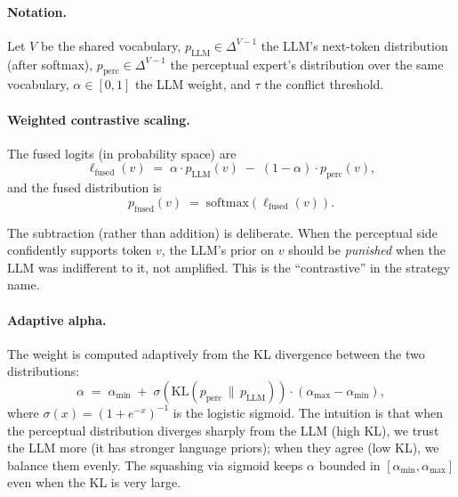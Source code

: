\documentclass[11pt,a4paper]{article}
\newcommand{\pLLM}{p_{\mathrm{LLM}}}
\newcommand{\pperc}{p_{\mathrm{perc}}}
\newcommand{\pfused}{p_{\mathrm{fused}}}
\newcommand{\alphamin}{\alpha_{\min}}
\newcommand{\alphamax}{\alpha_{\max}}
\newcommand{\softmax}{\mathrm{softmax}}
\newcommand{\KL}{\mathrm{KL}}
\begin{document}
\paragraph{Notation.}
Let $V$ be the shared vocabulary, $\pLLM \in \Delta^{V-1}$ the LLM's
next-token distribution (after softmax), $\pperc \in \Delta^{V-1}$ the
perceptual expert's distribution over the same vocabulary, $\alpha \in
[0, 1]$ the LLM weight, and $\tau$ the conflict threshold.

\paragraph{Weighted contrastive scaling.}
The fused logits (in probability space) are
\begin{equation}\label{eq:contrastive}
\ell_{\mathrm{fused}}(v) \;=\; \alpha \cdot \pLLM(v) \;-\; (1 - \alpha) \cdot \pperc(v),
\end{equation}
and the fused distribution is
\begin{equation}\label{eq:fused}
\pfused(v) \;=\; \softmax\!\left(\ell_{\mathrm{fused}}(v)\right).
\end{equation}

The subtraction (rather than addition) is deliberate. When the perceptual
side confidently supports token $v$, the LLM's prior on $v$ should be
\emph{punished} when the LLM was indifferent to it, not amplified.
This is the ``contrastive'' in the strategy name.

\paragraph{Adaptive alpha.}
The weight is computed adaptively from the KL divergence between the two
distributions:
\begin{equation}\label{eq:adaptive-alpha}
\alpha \;=\; \alphamin \;+\; \sigma\!\left(\KL(\pperc \,\|\, \pLLM)\right)
\cdot (\alphamax - \alphamin),
\end{equation}
where $\sigma(x) = (1 + e^{-x})^{-1}$ is the logistic sigmoid. The
intuition is that when the perceptual distribution diverges sharply
from the LLM (high KL), we trust the LLM more (it has stronger language
priors); when they agree (low KL), we balance them evenly. The squashing
via sigmoid keeps $\alpha$ bounded in $[\alphamin, \alphamax]$ even when
the KL is very large.
\end{document}
